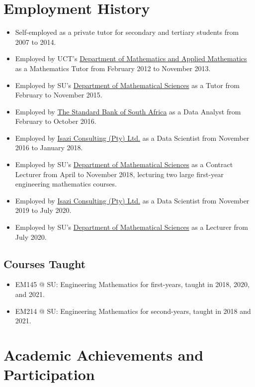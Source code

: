 \documentclass{article}
\begin{document}
\section{Employment History}
\begin{itemize}
	\item Self-employed as a private tutor for secondary and tertiary students from 2007 to 2014.
	\item Employed by UCT's \href{http://www.math.uct.ac.za/}{Department of Mathematics and Applied Mathematics} as a Mathematics Tutor from February 2012 to November 2013.
	\item Employed by SU's \href{http://www.sun.ac.za/english/faculty/science/Mathematics}{Department of Mathematical Sciences} as a Tutor from February to November 2015.
	\item Employed by \href{https://www.standardbank.co.za/}{The Standard Bank of South Africa} as a Data Analyst from February to October 2016.
	\item Employed by \href{http://www.isaziconsulting.co.za}{Isazi Consulting (Pty) Ltd.} as a Data Scientist from November 2016 to January 2018.
	\item Employed by SU's \href{http://www.sun.ac.za/english/faculty/science/Mathematics}{Department of Mathematical Sciences} as a Contract Lecturer from April to November 2018, lecturing two large first-year engineering mathematics courses.
	\item Employed by \href{http://www.isaziconsulting.co.za}{Isazi Consulting (Pty) Ltd.} as a Data Scientist from November 2019 to July 2020.
	\item Employed by SU's \href{http://www.sun.ac.za/english/faculty/science/Mathematics}{Department of Mathematical Sciences} as a Lecturer from July 2020.
\end{itemize}

\subsection{Courses Taught}
\begin{itemize}
	\item EM145 @ SU: Engineering Mathematics for first-years, taught in 2018, 2020, and 2021.
	\item EM214 @ SU: Engineering Mathematics for second-years, taught in 2018 and 2021.
\end{itemize}


\section{Academic Achievements and Participation}
\end{document}
